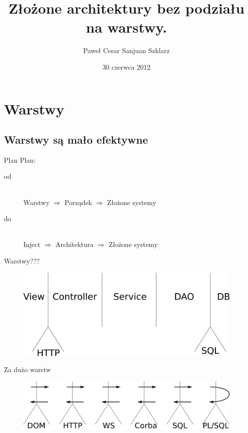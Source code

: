 \documentclass[smaller]{beamer}
\title[Złożone architektury - implementacja]{Złożone architektury bez podziału na warstwy.}
\author{Paweł Cesar Sanjuan Szklarz}
\institute{Confitura 2012}
\date{30 czerwca 2012}
\begin{document}
\begin{frame}
\titlepage
\end{frame}


\section{Warstwy}
\subsection{Warstwy są mało efektywne}

\begin{frame}{Plan}
Plan:
\begin{description}
 \item[od] \hfill \\
 Warstwy $\Rightarrow$ Porządek $\Rightarrow$ Złożone systemy
 \item[do] \hfill \\
 Inject $\Rightarrow$ Architektura $\Rightarrow$ Złożone systemy
\end{description}
\end{frame}

\begin{frame}{Warstwy???}
 \begin{figure}
 \centering
 \includegraphics[width=1\textwidth]{3warstwyFig}
\end{figure}
\end{frame}

\begin{frame}{Za dużo warstw}
\begin{figure}
 \centering
 \includegraphics[width=1\textwidth]{duzoWarstwFig}
\end{figure}
\end{frame}
\end{document}
